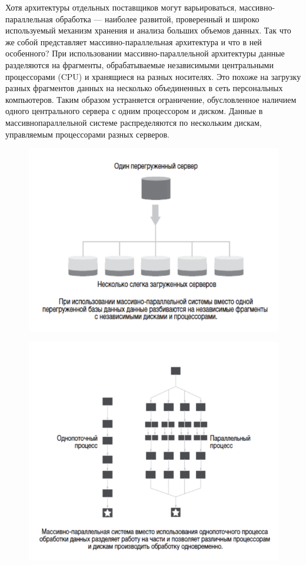 Хотя архитектуры отдельных поставщиков могут варьироваться, массивно-
параллельная обработка — наиболее развитой, проверенный и широко используемый механизм хранения и анализа больших объемов данных. Так что же собой
представляет массивно-параллельная архитектура и что в ней особенного?
При использовании массивно-параллельной архитектуры данные
разделяются на фрагменты, обрабатываемые независимыми
центральными процессорами (CPU) и хранящиеся на разных носителях.
Это похоже на загрузку разных фрагментов данных на несколько
объединенных в сеть персональных компьютеров. Таким образом
устраняется ограничение, обусловленное наличием одного центрального
сервера с одним процессором и диском. Данные в массивнопараллельной
системе распределяются по нескольким дискам, управляемым
процессорами разных серверов.

\begin{figure}[ht!]
	\centering
	\includegraphics[width=18cm, keepaspectratio]{assets/MPP-1.png}
	\caption{} 
\end{figure}
\FloatBarrier

\begin{figure}[ht!]
	\centering
	\includegraphics[width=18cm, keepaspectratio]{assets/MPP-2.png}
	\caption{} 
\end{figure}
\FloatBarrier

